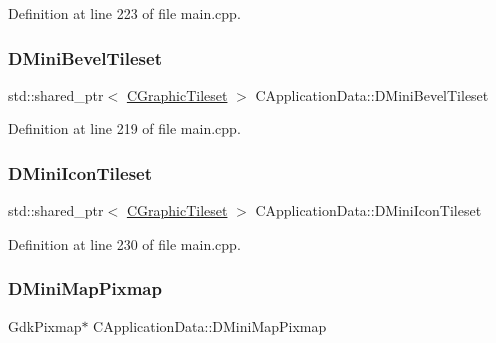 Definition at line 223 of file main.\+cpp.

\hypertarget{classCApplicationData_a74527a373eef061540615e61928f9706}{}\label{classCApplicationData_a74527a373eef061540615e61928f9706} 
\subsubsection{\texorpdfstring{D\+Mini\+Bevel\+Tileset}{DMiniBevelTileset}}
{\footnotesize\ttfamily std\+::shared\+\_\+ptr$<$ \hyperlink{classCGraphicTileset}{C\+Graphic\+Tileset} $>$ C\+Application\+Data\+::\+D\+Mini\+Bevel\+Tileset\hspace{0.3cm}{\ttfamily [protected]}}



Definition at line 219 of file main.\+cpp.

\hypertarget{classCApplicationData_aa7d7e4c8be514246089546f4d98d74f2}{}\label{classCApplicationData_aa7d7e4c8be514246089546f4d98d74f2} 
\subsubsection{\texorpdfstring{D\+Mini\+Icon\+Tileset}{DMiniIconTileset}}
{\footnotesize\ttfamily std\+::shared\+\_\+ptr$<$ \hyperlink{classCGraphicTileset}{C\+Graphic\+Tileset} $>$ C\+Application\+Data\+::\+D\+Mini\+Icon\+Tileset\hspace{0.3cm}{\ttfamily [protected]}}



Definition at line 230 of file main.\+cpp.

\hypertarget{classCApplicationData_abe3af81659ead5113b7b2f165a88e737}{}\label{classCApplicationData_abe3af81659ead5113b7b2f165a88e737} 
\subsubsection{\texorpdfstring{D\+Mini\+Map\+Pixmap}{DMiniMapPixmap}}
{\footnotesize\ttfamily Gdk\+Pixmap$\ast$ C\+Application\+Data\+::\+D\+Mini\+Map\+Pixmap\hspace{0.3cm}{\ttfamily [protected]}}



